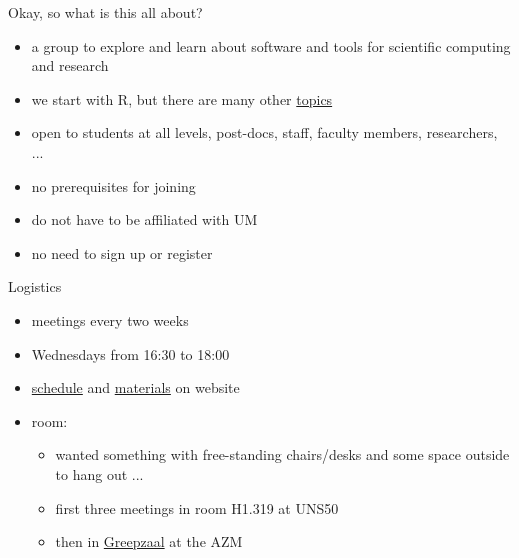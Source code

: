 \documentclass[t,12pt]{beamer}
\begin{document}
\begin{frame}{Okay, so what is this all about?}

\begin{itemize}
   \item a group to explore and learn about software and tools for scientific computing and research
   \item we start with R, but there are many other \href{https://wviechtb.github.io/scrum-club/topics.html}{topics}
   \item open to students at all levels, post-docs, staff, faculty members, researchers, ...
   \item no prerequisites for joining
   \item do not have to be affiliated with UM
   \item no need to sign up or register
\end{itemize}

\end{frame}


\begin{frame}{Logistics}

\begin{itemize}
   \item meetings every two weeks
   \item Wednesdays from 16:30 to 18:00
   \item \href{https://wviechtb.github.io/scrum-club/schedule.html}{schedule} and \href{https://wviechtb.github.io/scrum-club/materials/materials.html}{materials} on website
   \item room:
   \begin{itemize}
      \item wanted something with free-standing chairs/desks and some space outside to hang out ...
      \item first three meetings in room H1.319 at UNS50
      \item then in \href{http://www.mumcplattegrond.nl/\#map/d99_d26}{Greepzaal} at the AZM
   \end{itemize}
\end{itemize}

\end{frame}

\end{document}
